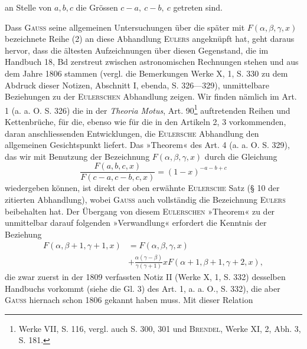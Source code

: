 an Stelle von \(a,b,c\) die Grössen \(c-a,\ c-b,\ c\) getreten sind.\par
\clearpage{}
\indent Dass \textsc{Gauss} seine allgemeinen Untersuchungen über die später mit
\(F(\alpha,\beta,\gamma,x)\) bezeichnete Reihe (2) an diese Abhandlung \textsc{Eulers} angeknüpft
hat, geht daraus hervor, dass die ältesten Aufzeichnungen über diesen Gegenstand,
die im Handbuch 18, Bd zerstreut zwischen astronomischen Rechnungen
stehen und aus dem Jahre 1806 stammen (vergl. die Bemerkungen Werke
X, 1, S. 330 zu dem Abdruck dieser Notizen, Abschnitt I, ebenda, S. 326—329),
unmittelbare Beziehungen zu der \textsc{Eulerschen} Abhandlung zeigen. Wir
finden nämlich im Art. 1 (a. a. O. S. 326) die in der \textit{Theoria Motus}, Art. 90\footnote{Werke VII, S. 116, vergl. auch S. 300, 301 und \textsc{Brendel}, Werke XI, 2, Abh. 3, S. 181.}
auftretenden Reihen und Kettenbrüche, für die, ebenso wie für die in den
Artikeln 2, 3 vorkommenden, daran anschliessenden Entwicklungen, die \textsc{Eulersche}
Abhandlung den allgemeinen Gesichtspunkt liefert. Das »Theorem« des
Art. 4 (a. a. O. S. 329), das wir mit Benutzung der Bezeichnung \(F(\alpha,\beta,\gamma,x)\)
durch die Gleichung
\begingroup\makeatletter\tagsleft@true\let\veqno\leqno\makeatother
\begin{equation*}
\frac{F(a,b,c,x)}{F(c-a,c-b,c,x)}=(1-x)^{-a-b+c}\tag{7}
\end{equation*}\endgroup
\noindent wiedergeben können, ist direkt der oben erwähnte \textsc{Eulersche} Satz (§ 10 der
zitierten Abhandlung), wobei \textsc{Gauss} auch vollständig die Bezeichnung \textsc{Eulers}
beibehalten hat. Der Übergang von diesem \textsc{Eulerschen} »Theorem« zu der
unmittelbar darauf folgenden »Verwandlung« erfordert die Kenntnis der Beziehung
\begingroup\makeatletter\tagsleft@true\let\veqno\leqno\makeatother
\begin{equation*}
\begin{aligned}
F(\alpha,\beta+1,\gamma+1,x)&=F(\alpha,\beta,\gamma,x)\\
&+\frac{\alpha(\gamma-\beta)}{\gamma(\gamma+1)}xF(\alpha+1,\beta+1,\gamma+2,x),
\end{aligned}\tag{8}
\end{equation*}\endgroup
\noindent die zwar zuerst in der 1809 verfassten Notiz II (Werke X, 1, S. 332) desselben
Handbuchs vorkommt (siehe die Gl. 3) des Art. 1, a. a. O., S. 332), die
aber \textsc{Gauss} hiernach schon 1806 gekannt haben muss. Mit dieser Relation
